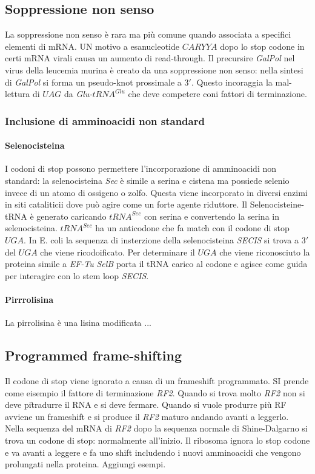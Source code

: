 \subsection{Soppressione non senso}
La soppressione non senso \`e rara ma pi\`u comune quando associata a specifici elementi di mRNA. UN motivo a esanucleotide $CARYYA$ dopo lo stop codone in certi mRNA virali causa
un aumento di read-through. Il precursire \emph{GalPol} nel virus della leucemia murina \`e creato da una soppressione non senso: nella sintesi di \emph{GalPol} si forma un 
pseudo-knot prossimale a $3'$. Questo incoraggia la mal-lettura di $UAG$ da \emph{Glu-$tRNA^{Glu}$} che deve competere coni fattori di terminazione. 
\subsubsection{Inclusione di amminoacidi non standard}
\paragraph{Selenocisteina}
I codoni di stop possono permettere l'incorporazione di amminoacidi non standard: la selenocisteina \emph{Sec} \`e simile a serina e cistena ma possiede selenio invece di un atomo
di ossigeno o zolfo. Questa viene incorporato in diversi enzimi in siti cataliticii dove pu\`o agire come un forte agente riduttore. Il Selenocisteine-tRNA \`e generato caricando 
\emph{$tRNA^{Sec}$} con serina e convertendo la serina in selenocisteina. \emph{$tRNA^{Sec}$} ha un anticodone che fa match con il codone di stop $UGA$. In E. coli la sequenza di 
insterzione della selenocisteina \emph{SECIS} si trova a $3'$ del $UGA$ che viene ricodoificato. Per determinare il $UGA$ che viene riconosciuto la proteina simile a \emph{EF-Tu} 
\emph{SelB} porta il tRNA carico al codone e agisce come guida per interagire con lo stem loop \emph{SECIS}. 
\paragraph{Pirrrolisina}
La pirrolisina \`e una lisina modificata ...
\subsection{Programmed frame-shifting}
Il codone di stop viene ignorato a causa di un frameshift programmato. SI prende come eisempio il fattore di terminazione \emph{RF2}. Quando si trova molto \emph{RF2} non si deve pi\`
tradurre il RNA e si deve fermare. Quando si vuole produrre pi\`u RF avviene un frameshift e si produce il \emph{RF2} maturo andando avanti a leggerlo. Nella sequenza del mRNA di 
\emph{RF2} dopo la sequenza normale di Shine-Dalgarno si trova un codone di stop: normalmente all'inizio. Il ribosoma ignora lo stop codone e va avanti a leggere e fa uno shift 
includendo i nuovi amminoacidi che vengono prolungati nella proteina. Aggiungi esempi.


